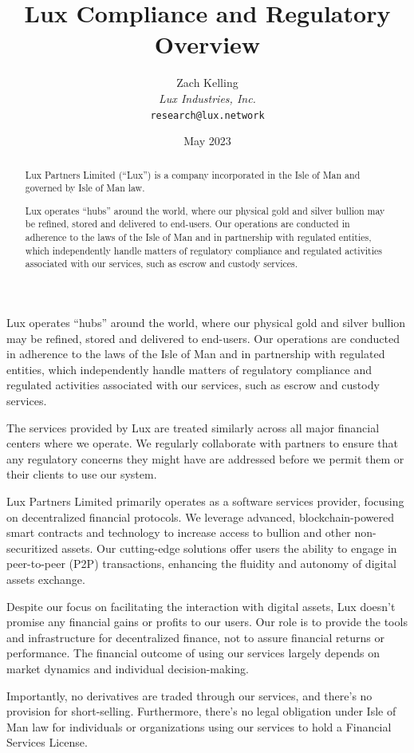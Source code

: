 \documentclass[11pt]{article}
\title{Lux Compliance and Regulatory Overview}
\author{Zach Kelling\\\textit{Lux Industries, Inc.}\\\texttt{research@lux.network}}
\date{May 2023}
\begin{document}
\luxcoverpage

\begin{abstract}
Lux Partners Limited (``Lux'') is a company incorporated in the Isle of Man and governed by Isle of Man law.

Lux operates ``hubs'' around the world, where our physical gold and silver bullion may be refined, stored and delivered to end-users. Our operations are conducted in adherence to the laws of the Isle of Man and in partnership with regulated entities, which independently handle matters of regulatory compliance and regulated activities associated with our services, such as escrow and custody services.
\end{abstract}

\tableofcontents
\newpage


Lux operates ``hubs'' around the world, where our physical gold and silver bullion may be refined, stored and delivered to end-users. Our operations are conducted in adherence to the laws of the Isle of Man and in partnership with regulated entities, which independently handle matters of regulatory compliance and regulated activities associated with our services, such as escrow and custody services.


The services provided by Lux are treated similarly across all major financial centers where we operate. We regularly collaborate with partners to ensure that any regulatory concerns they might have are addressed before we permit them or their clients to use our system.


Lux Partners Limited primarily operates as a software services provider, focusing on decentralized financial protocols. We leverage advanced, blockchain-powered smart contracts and technology to increase access to bullion and other non-securitized assets. Our cutting-edge solutions offer users the ability to engage in peer-to-peer (P2P) transactions, enhancing the fluidity and autonomy of digital assets exchange.


Despite our focus on facilitating the interaction with digital assets, Lux doesn't promise any financial gains or profits to our users. Our role is to provide the tools and infrastructure for decentralized finance, not to assure financial returns or performance. The financial outcome of using our services largely depends on market dynamics and individual decision-making.


Importantly, no derivatives are traded through our services, and there's no provision for short-selling. Furthermore, there's no legal obligation under Isle of Man law for individuals or organizations using our services to hold a Financial Services License.
\end{document}
